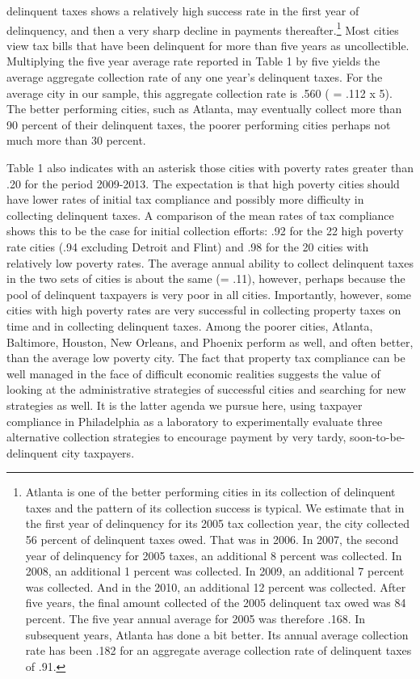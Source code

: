\documentclass[12pt,titlepage]{article}
\begin{document}
delinquent taxes shows a relatively high success rate in the first
year of delinquency, and then a very sharp decline in payments
thereafter.\footnote{Atlanta is one of the better performing cities in
  its collection of delinquent taxes and the pattern of its collection
  success is typical.  We estimate that in the first year of
  delinquency for its 2005 tax collection year, the city collected 56
  percent of delinquent taxes owed. That was in 2006.  In 2007, the
  second year of delinquency for 2005 taxes, an additional 8 percent
  was collected.  In 2008, an additional 1 percent was collected.  In
  2009, an additional 7 percent was collected.  And in the 2010, an
  additional 12 percent was collected.  After five years, the final
  amount collected of the 2005 delinquent tax owed was 84 percent.
  The five year annual average for 2005 was therefore .168.  In
  subsequent years, Atlanta has done a bit better.  Its annual average
  collection rate has been .182 for an aggregate average collection
  rate of delinquent taxes of .91.} Most cities view tax bills that
have been delinquent for more than five years as uncollectible.
Multiplying the five year average rate reported in Table 1 by five
yields the average aggregate collection rate of any one year's
delinquent taxes.  For the average city in our sample, this aggregate
collection rate is .560 ( = .112 x 5).  The better performing cities,
such as Atlanta, may eventually collect more than 90 percent of their
delinquent taxes, the poorer performing cities perhaps not much more
than 30 percent.

Table 1 also indicates with an asterisk those cities with poverty rates greater than
.20 for the period 2009-2013.  The expectation is that high poverty
cities should have lower rates of initial tax compliance and possibly
more difficulty in collecting delinquent taxes.  A comparison of the
mean rates of tax compliance shows this to be the case for initial
collection efforts: .92 for the 22 high poverty rate cities (.94
excluding Detroit and Flint) and .98 for the 20 cities with relatively
low poverty rates.  The average annual ability to collect delinquent
taxes in the two sets of cities is about the same (= .11), however,
perhaps because the pool of delinquent taxpayers is very poor in all
cities.  Importantly, however, some cities with high poverty rates are
very successful in collecting property taxes on time and in collecting
delinquent taxes.  Among the poorer cities, Atlanta, Baltimore,
Houston, New Orleans, and Phoenix perform as well, and often better,
than the average low poverty city.  The fact that property tax
compliance can be well managed in the face of difficult economic
realities suggests the value of looking at the administrative
strategies of successful cities and searching for new strategies as
well.  It is the latter agenda we pursue here, using taxpayer
compliance in Philadelphia as a laboratory to experimentally evaluate
three alternative collection strategies to encourage payment by very tardy,
soon-to-be-delinquent city taxpayers.
\end{document}

